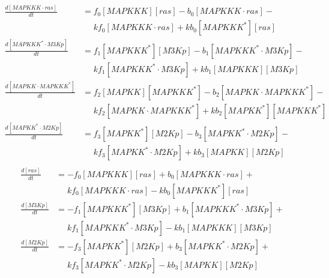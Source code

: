 \begin{equation*}
  \begin{align*}
    \frac{d[MAPKKK\cdot{}ras]}{dt} &= f_{0}[MAPKKK][ras] - b_{0}[MAPKKK\cdot{}ras] -\\
    &\phantom{=} kf_{0}[MAPKKK\cdot{}ras] + kb_{0}[MAPKKK^{*}][ras]\\
    \frac{d[MAPKKK^{*}\cdot{}M3Kp]}{dt} &= f_{1}[MAPKKK^{*}][M3Kp] - b_{1}[MAPKKK^{*}\cdot{}M3Kp] -\\
    &\phantom{=} kf_{1}[MAPKKK^{*}\cdot{}M3Kp] + kb_{1}[MAPKKK][M3Kp]\\
    \frac{d[MAPKK\cdot{}MAPKKK^{*}]}{dt} &= f_{2}[MAPKK][MAPKKK^{*}] - b_{2}[MAPKK\cdot{}MAPKKK^{*}] -\\
    &\phantom{=} kf_{2}[MAPKK\cdot{}MAPKKK^{*}] + kb_{2}[MAPKK^{*}][MAPKKK^{*}]\\
    \frac{d[MAPKK^{*}\cdot{}M2Kp]}{dt} &= f_{3}[MAPKK^{*}][M2Kp] - b_{3}[MAPKK^{*}\cdot{}M2Kp] -\\
    &\phantom{=} kf_{3}[MAPKK^{*}\cdot{}M2Kp] + kb_{3}[MAPKK][M2Kp]\\
  \end{align*}
\end{equation*}
\begin{equation*}
  \begin{align*}
    \frac{d[ras]}{dt} &= -f_{0}[MAPKKK][ras] + b_{0}[MAPKKK\cdot{}ras] +\\
    &\phantom{=} kf_{0}[MAPKKK\cdot{}ras] - kb_{0}[MAPKKK^{*}][ras]\\
    \frac{d[M3Kp]}{dt} &= -f_{1}[MAPKKK^{*}][M3Kp] + b_{1}[MAPKKK^{*}\cdot{}M3Kp] +\\
    &\phantom{=} kf_{1}[MAPKKK^{*}\cdot{}M3Kp] - kb_{1}[MAPKKK][M3Kp]\\
    \frac{d[M2Kp]}{dt} &= -f_{3}[MAPKK^{*}][M2Kp] + b_{3}[MAPKK^{*}\cdot{}M2Kp] +\\
    &\phantom{=} kf_{3}[MAPKK^{*}\cdot{}M2Kp] - kb_{3}[MAPKK][M2Kp]\\
  \end{align*}
\end{equation*}
\normalsize

